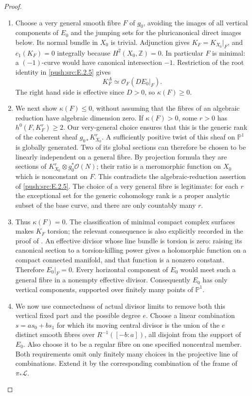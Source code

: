 \begin{proof}

\begin{enumerate}[label={$\langle1\rangle$\arabic*.},leftmargin=*]
\item Choose a very general smooth fibre $F$ of $g_0$, avoiding the
images of all vertical components of $E_0$ and the jumping
sets for the pluricanonical direct images below.  Its normal
bundle in $X_0$ is trivial.  Adjunction gives
$K_F=K_{X_0}|_F$, and $c_1(K_F)=0$ integrally because
$H^2(X_0,\mathbb Z)=0$.  In particular $F$ is minimal: a
$(-1)$-curve would have canonical intersection $-1$.
Restriction of the root identity in \ref{push:src:E.2.5} gives
\[
 K_F^{A}\simeq\mathcal O_F(D E_0|_F).
\]
The right hand side is effective since $D>0$, so
$\kappa(F)\ge0$.

\item We next show $\kappa(F)\le0$, without assuming that the fibres
of an algebraic reduction have algebraic dimension zero.
If $\kappa(F)>0$, some $r>0$ has $h^0(F,K_F^r)\ge2$.
Our very-general choice ensures that this is the generic rank
of the coherent sheaf $g_{0*}K_{X_0}^r$.  A sufficiently
positive twist of this sheaf on $\mathbb P^1$ is globally
generated.  Two of its global sections can therefore be
chosen to be linearly independent on a general fibre.  By
projection formula they are sections of
$K_{X_0}^r\otimes g_0^*\mathcal O(N)$; their ratio is a
meromorphic function on $X_0$ which is nonconstant on $F$.
This contradicts the algebraic-reduction assertion of \ref{push:src:E.2.5}.
The choice of a very general fibre is legitimate: for each
$r$ the exceptional set for the generic cohomology rank is
a proper analytic subset of the base curve, and there are
only countably many $r$.

\item Thus $\kappa(F)=0$.  The classification of minimal compact
complex surfaces makes $K_F$ torsion; the relevant consequence
is also explicitly recorded in the proof of
\citet[Proposition~3.1.2]{AbashevaDeev2024AB}.
An effective divisor whose line bundle is torsion is zero:
raising its canonical section to a torsion-killing power
gives a holomorphic function on a compact connected manifold,
and that function is a nonzero constant.  Therefore
$E_0|_F=0$.  Every horizontal component of $E_0$ would meet
such a general fibre in a nonempty effective divisor.
Consequently $E_0$ has only vertical components, supported
over finitely many points of $\mathbb P^1$.

\item We now use connectedness of actual divisor limits to remove
both this vertical fixed part and the possible degree $e$.
Choose a linear combination $s=as_0+bs_1$ for which its
moving central divisor is the union of the $e$ distinct
smooth fibres over $R^{-1}([-b:a])$, all disjoint from the
support of $E_0$.  Also choose it to be a regular fibre on
one specified noncentral member.  Both requirements omit
only finitely many choices in the projective line of
combinations.  Extend it by the corresponding combination
of the frame of $\pi_*\mathcal L$.


\end{enumerate}
\end{proof}
